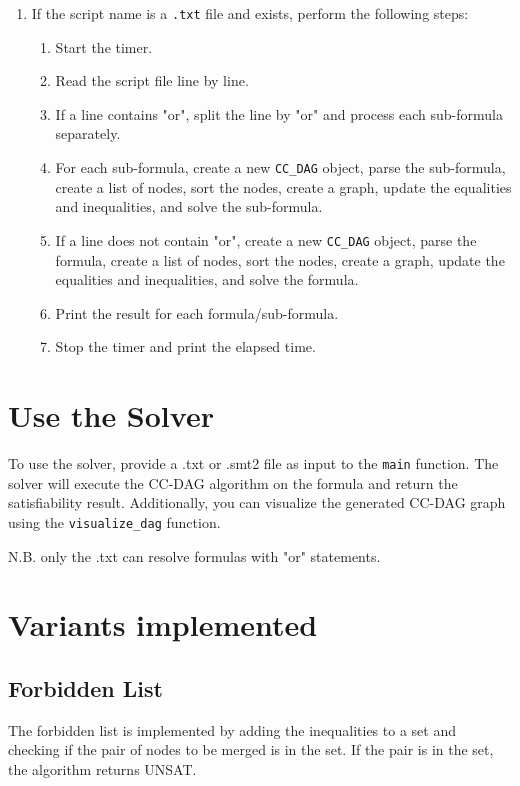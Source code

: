 \documentclass[11pt]{report}
\begin{document}
\begin{enumerate}
    \item If the script name is a \texttt{.txt} file and exists, perform the following steps:
    \begin{enumerate}
        \item Start the timer.
        
        \item Read the script file line by line.
        
        \item If a line contains "or", split the line by "or" and process each sub-formula separately.
        
        \item For each sub-formula, create a new \texttt{CC\_DAG} object, parse the sub-formula, create a list of nodes, sort the nodes, create a graph, update the equalities and inequalities, and solve the sub-formula.
        
        \item If a line does not contain "or", create a new \texttt{CC\_DAG} object, parse the formula, create a list of nodes, sort the nodes, create a graph, update the equalities and inequalities, and solve the formula.
        
        \item Print the result for each formula/sub-formula.
        
        \item Stop the timer and print the elapsed time.
    \end{enumerate}
\end{enumerate}
\section*{Use the Solver}
To use the solver, provide a .txt or .smt2 file as input to the \texttt{main} function. The solver will execute the CC-DAG algorithm on the formula and return the satisfiability result. 
Additionally, you can visualize the generated CC-DAG graph using the \texttt{visualize\_dag} function.

N.B. only the .txt can resolve formulas with "or" statements. 

\section*{Variants implemented}
\subsection*{Forbidden List}
The forbidden list is implemented by adding the inequalities to a set and checking if the pair of nodes to be merged is in the set. If the pair is in the set, the algorithm returns UNSAT.
\end{document}
